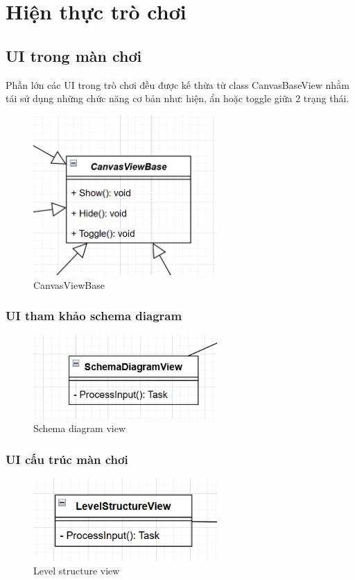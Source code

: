 \section{Hiện thực trò chơi}
\subsection{UI trong màn chơi}
Phần lớn các UI trong trò chơi đều được kế thừa từ class CanvasBaseView nhằm tái sử dụng những chức năng cơ bản như: hiện, ẩn hoặc toggle giữa 2 trạng thái.
\begin{figure}[H]
	\centering
	\includegraphics[width=7cm]{Images/CanvasViewBase.png}
	\vspace{0.5cm}
	\caption{CanvasViewBase}
\end{figure}

\subsubsection{UI tham khảo schema diagram}
\begin{figure}[H]
	\centering
	\includegraphics[width=7cm]{Images/SchemaDiagramView.png}
	\vspace{0.5cm}
	\caption{Schema diagram view}
\end{figure}

\subsubsection{UI cấu trúc màn chơi}
\begin{figure}[H]
	\centering
	\includegraphics[width=7cm]{Images/LevelStructureView.png}
	\vspace{0.5cm}
	\caption{Level structure view}
\end{figure}

